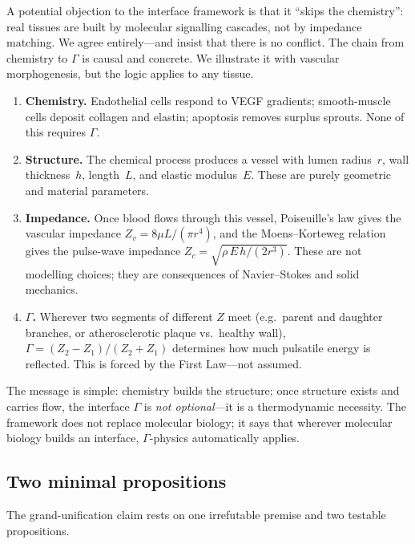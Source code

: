 \documentclass[aps,pre,twocolumn,superscriptaddress,floatfix]{revtex4-2}
\begin{document}
A potential objection to the interface framework is that it
``skips the chemistry'': real tissues are built by molecular
signalling cascades, not by impedance matching.
We agree entirely---and insist that there is no conflict.
The chain from chemistry to $\Gamma$ is causal and concrete.
We illustrate it with vascular morphogenesis, but the logic
applies to any tissue.

\begin{enumerate}
  \item \textbf{Chemistry.}
    Endothelial cells respond to VEGF gradients;
    smooth-muscle cells deposit collagen and elastin;
    apoptosis removes surplus sprouts.
    None of this requires $\Gamma$.

  \item \textbf{Structure.}
    The chemical process produces a vessel with
    lumen radius~$r$, wall thickness~$h$, length~$L$,
    and elastic modulus~$E$.
    These are purely geometric and material parameters.

  \item \textbf{Impedance.}
    Once blood flows through this vessel, Poiseuille's
    law gives the vascular impedance
    $Z_v = 8\mu L / (\pi r^4)$,
    and the Moens--Korteweg relation gives
    the pulse-wave impedance
    $Z_c = \sqrt{\rho\, E\, h / (2 r^3)}$.
    These are not modelling choices; they are consequences
    of Navier--Stokes and solid mechanics.

  \item \textbf{$\Gamma$.}
    Wherever two segments of different $Z$ meet
    (e.g.\ parent and daughter branches, or
    atherosclerotic plaque vs.\ healthy wall),
    $\Gamma = (Z_2 - Z_1)/(Z_2 + Z_1)$
    determines how much pulsatile energy is reflected.
    This is forced by the First Law---not assumed.
\end{enumerate}

The message is simple: chemistry builds the structure;
once structure exists and carries flow, the interface
$\Gamma$ is \emph{not optional}---it is a thermodynamic
necessity.  The framework does not replace molecular
biology; it says that wherever molecular biology builds
an interface, $\Gamma$-physics automatically applies.

\subsection{Two minimal propositions}
\label{sec:two-propositions}

The grand-unification claim rests on one irrefutable
premise and two testable propositions.
\end{document}
